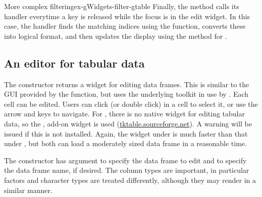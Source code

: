 \begin{example}{More complex filtering}{ex-gWidgets-filter-gtable}
Finally, the  method calls its handler
everytime a key is released while the focus is in the edit widget. In
this case, the handler finds the matching indices using the
 function, converts these into logical format, and then
updates the display using the  method for
  .
\begin{Schunk}
\end{Schunk}
\end{example}



\subsection{An editor for tabular data}
\label{sec:gWidgets-an-editor-tabular}

The  constructor returns a  widget for editing data frames. This is similar to the GUI provided by the  function, but uses the underlying toolkit in use by . Each cell can be edited. Users can click (or double click) in a cell to select it, or use the arrow and  keys to navigate. For , there is no native widget for editing tabular data, so the , add-on widget is used (\url{tktable.sourceforge.net}). A warning will be issued if this is not installed. Again, the widget under  is much faster than that under , but both can load a moderately sized data frame in a reasonable time.

The constructor has argument  to specify the data frame to edit and  to specify the data frame name, if desired. The column types are important, in particular factors and character types are treated differently, although they may render in a similar manner. 

